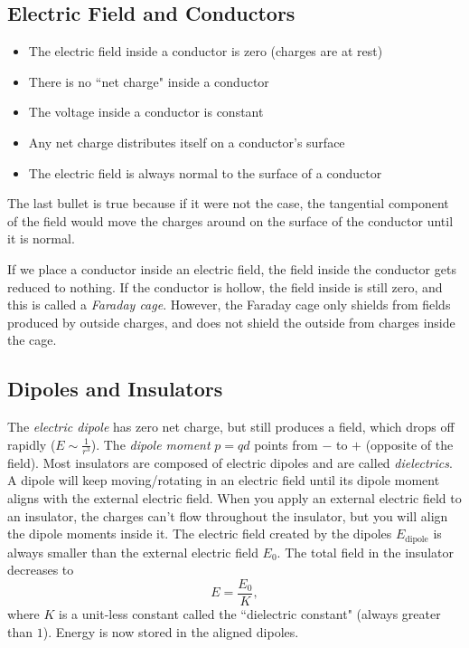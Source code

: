 \documentclass[class=article, crop=false]{standalone}
\begin{document}
  \subsection{Electric Field and Conductors}
  \begin{itemize}
    \item The electric field inside a conductor is zero (charges are at rest)
    \item There is no ``net charge" inside a conductor
    \item The voltage inside a conductor is constant
    \item Any net charge distributes itself on a conductor's surface
    \item The electric field is always normal to the surface of a conductor
  \end{itemize}
  \begin{note}{}
    The last bullet is true because if it were not the case, the tangential component of the field would move the charges around on the surface of the conductor until it is normal.
  \end{note}
  If we place a conductor inside an electric field, the field inside the conductor gets reduced to nothing. If the conductor is hollow, the field inside is still zero, and this is called a \emph{Faraday cage}. However, the Faraday cage only shields from fields produced by outside charges, and does not shield the outside from charges inside the cage.
  \subsection{Dipoles and Insulators}
  The \emph{electric dipole} has zero net charge, but still produces a field, which drops off rapidly ($E\sim \frac{1}{r^3}$). The \emph{dipole moment} $p = qd$ points from $-$ to $+$ (opposite of the field). Most insulators are composed of electric dipoles and are called \emph{dielectrics}. A dipole will keep moving/rotating in an electric field until its dipole moment aligns with the external electric field. When you apply an external electric field to an insulator, the charges can't flow throughout the insulator, but you will align the dipole moments inside it. The electric field created by the dipoles $E_{\text{dipole}}$ is always smaller than the external electric field $E_0$. The total field in the insulator decreases to
  \[
    E = \frac{E_0}{K},
  \]
  where $K$ is a unit-less constant called the ``dielectric constant" (always greater than $1$). Energy is now stored in the aligned dipoles.
\end{document}
